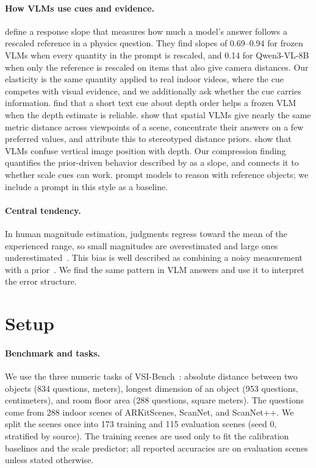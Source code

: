 \documentclass[letterpaper]{article} %
\begin{document}
\paragraph{How VLMs use cues and evidence.}
\citet{tan2026scale} define a response slope that measures how much a model's answer follows a rescaled reference in a physics question. They find slopes of 0.69--0.94 for frozen VLMs when every quantity in the prompt is rescaled, and 0.14 for Qwen3-VL-8B when only the reference is rescaled on items that also give camera distances. Our elasticity is the same quantity applied to real indoor videos, where the cue competes with visual evidence, and we additionally ask whether the cue carries information. \citet{vo2026depth} find that a short text cue about depth order helps a frozen VLM when the depth estimate is reliable. \citet{bhat2026consistent} show that spatial VLMs give nearly the same metric distance across viewpoints of a scene, concentrate their answers on a few preferred values, and attribute this to stereotyped distance priors. \citet{min2026whyfar} show that VLMs confuse vertical image position with depth. Our compression finding quantifies the prior-driven behavior described by \citet{bhat2026consistent} as a slope, and connects it to whether scale cues can work. \citet{liao2024reasoning} prompt models to reason with reference objects; we include a prompt in this style as a baseline.

\paragraph{Central tendency.}
In human magnitude estimation, judgments regress toward the mean of the experienced range, so small magnitudes are overestimated and large ones underestimated~\citep{hollingworth1910central}. This bias is well described as combining a noisy measurement with a prior~\citep{jazayeri2010temporal}. We find the same pattern in VLM answers and use it to interpret the error structure.

\section{Setup}

\paragraph{Benchmark and tasks.}
We use the three numeric tasks of VSI-Bench~\citep{yang2025thinking}: absolute distance between two objects (834 questions, meters), longest dimension of an object (953 questions, centimeters), and room floor area (288 questions, square meters). The questions come from 288 indoor scenes of ARKitScenes, ScanNet, and ScanNet++. We split the scenes once into 173 training and 115 evaluation scenes (seed 0, stratified by source). The training scenes are used only to fit the calibration baselines and the scale predictor; all reported accuracies are on evaluation scenes unless stated otherwise.
\end{document}
